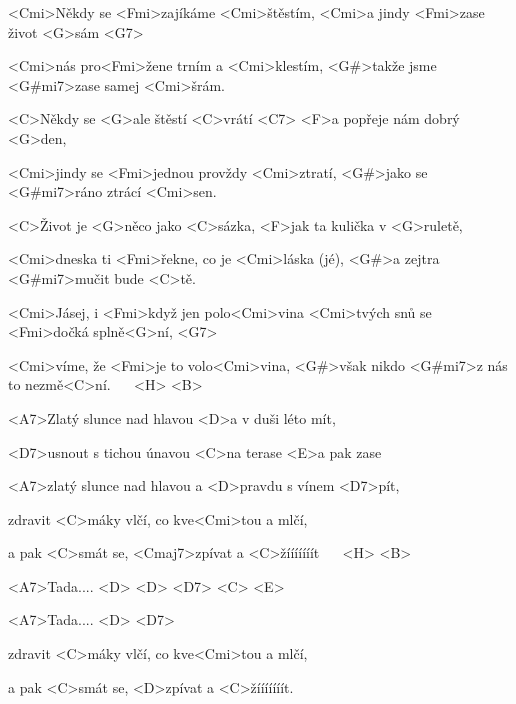 

\zs

<Cmi>Někdy se <Fmi>zajíkáme <Cmi>štěstím,
<Cmi>a jindy <Fmi>zase život <G>sám <G7>

<Cmi>nás pro<Fmi>žene trním a <Cmi>klestím,
<G#>takže jsme <G#mi7>zase samej <Cmi>šrám.

<C>Někdy se <G>ale štěstí <C>vrátí <C7>
<F>a popřeje nám dobrý <G>den,

<Cmi>jindy se <Fmi>jednou provždy <Cmi>ztratí,
<G#>jako se <G#mi7>ráno ztrácí <Cmi>sen.

<C>Život je <G>něco jako <C>sázka,
<F>jak ta kulička v <G>ruletě,

<Cmi>dneska ti <Fmi>řekne, co je <Cmi>láska (jé),
<G#>a zejtra <G#mi7>mučit bude <C>tě.

<Cmi>Jásej, i <Fmi>když jen polo<Cmi>vina
<Cmi>tvých snů se <Fmi>dočká splně<G>ní, <G7>

<Cmi>víme, že <Fmi>je to volo<Cmi>vina,
<G#>však nikdo <G#mi7>z nás to nezmě<C>ní. ~~ <H> <B> 
\ks

\zr
<A7>Zlatý slunce nad hlavou
<D>a v duši léto mít,

<D7>usnout s tichou únavou
<C>na terase <E>a pak zase

<A7>zlatý slunce nad hlavou
a <D>pravdu s vínem <D7>pít,

zdravit <C>máky vlčí,
co kve<Cmi>tou a mlčí,

a pak <C>smát se, <Cmaj7>zpívat a <C>žííííííít ~~ <H> <B> 
\kr

\zr

<A7>Tada.... <D> <D> <D7> <C> <E>

<A7>Tada.... <D> <D7>


zdravit <C>máky vlčí,
co kve<Cmi>tou a mlčí,

a pak <C>smát se, <D>zpívat a <C>žííííííít.
\kr

\kp
